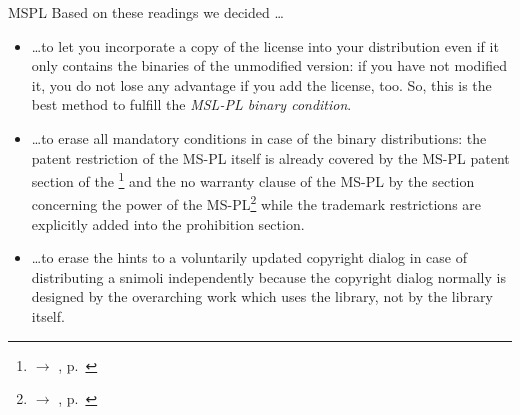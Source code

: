 \begin{license}{MSPL}
Based on these readings we decided \ldots

\label{MsplSourceBinHint} 
\begin{itemize}
  \item \ldots to let you incorporate a copy of the license into your
  distribution even if it only contains the binaries of the unmodified version:
  if you have not modified it, you do not lose any advantage if you add the
  license, too. So, this is the best method to fulfill the \emph{MSL-PL binary
  condition}.
  \item \ldots to erase all mandatory conditions in case of the binary
  distributions: the patent restriction of the MS-PL itself is already covered
  by the MS-PL patent section of the \oslic\footnote{$\rightarrow$ \oslic, p.\
  } and the no warranty clause of the MS-PL by
  the \oslic{} section concerning the power of the MS-PL\footnote{$\rightarrow$
  \oslic, p.\ \protectionpageref{MSPL}} while the trademark
  restrictions are explicitly added into the prohibition section.
  \item \ldots to erase the hints to a voluntarily updated copyright dialog in
  case of distributing a snimoli independently because the copyright dialog
  normally is designed by the overarching work which uses the library, not by
  the library itself.
\end{itemize}

\end{license}

%

